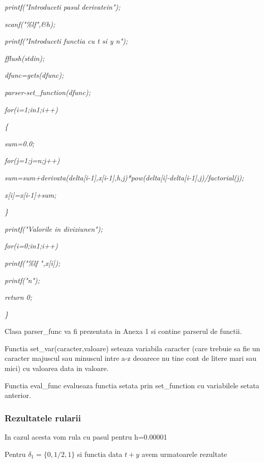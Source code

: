 \documentclass[a4paper,twoside]{book}
\begin{document}
\textit{\qquad printf("Introduceti pasul derivatei\TEXTsymbol{\backslash}n");%
}

\textit{\qquad scanf("\%lf",\&h);}

\textit{\qquad printf("Introduceti functia cu t si y\TEXTsymbol{\backslash}%
n");}

\textit{\qquad fflush(stdin);}

\textit{\qquad dfunc=gets(dfunc);}

\textit{\qquad parser-\TEXTsymbol{>}set\_function(dfunc);}

\textit{\qquad for(i=1;i\TEXTsymbol{<}n1;i++)}

\textit{\qquad \{}

\textit{\qquad \qquad sum=0.0;}

\textit{\qquad \qquad for(j=1;j\TEXTsymbol{<}=n;j++)}

\textit{\qquad \qquad \qquad
sum=sum+derivata(delta[i-1],x[i-1],h,j)*pow(delta[i]-delta[i-1],j)/factorial(j);%
}

\textit{\qquad \qquad x[i]=x[i-1]+sum;}

\textit{\qquad \}}

\textit{\qquad printf("Valorile in diviziune\TEXTsymbol{\backslash}n");}

\textit{\qquad for(i=0;i\TEXTsymbol{<}n1;i++)}

\textit{\qquad \qquad printf("\%lf ",x[i]);}

\textit{\qquad printf("\TEXTsymbol{\backslash}n");}

\textit{\qquad return 0;}

\textit{\}}

Clasa parser\_func va fi prezentata in Anexa 1 si contine parserul de
functii.

Functia set\_var(caracter,valoare) seteaza variabila caracter (care trebuie
sa fie un caracter majuscul sau minuscul intre a-z deoarece nu tine cont de
litere mari sau mici) cu valoarea data in valoare.

Functia eval\_func evalueaza functia setata prin set\_function cu
variabilele setata anterior.

\subsubsection{Rezultatele rularii}

In cazul acesta vom rula cu pasul pentru h=0.00001

Pentru $\delta _{1}=\{0,1/2,1\}$ si functia data $t+y$ avem urmatoarele
rezultate
\end{document}
